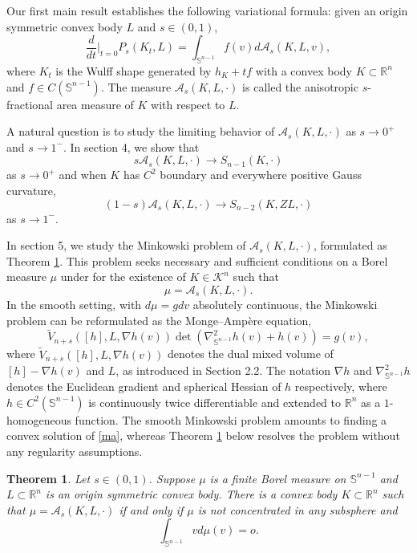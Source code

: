 \documentclass[12pt, oneside,reqno]{amsart}
\numberwithin{equation}{section}
\newtheorem{theorem}{Theorem}[section]
\newtheorem{definition and theorem}[theorem]{Definition and Theorem}
\newcommand{\tA}{\mathcal{A}_s}
\theoremstyle{plain}
\theoremstyle{remark}
\theoremstyle{definition}
\newcommand{\sn}{{\mathbb S}^{n-1}}
\newcommand{\cb}{\color{blue}}
\newcommand{\rn}{\mathbb R^n}
\newcommand{\tk}{\mathcal{K}}
\begin{document}



Our first main result establishes the following variational formula: given an origin symmetric convex body $L$ and $s\in(0,1)$,  
\[\frac{d}{dt}\Big|_{t=0}P_s(K_t,L)=\int_{\sn}f(v)d\tA(K,L,v),\]
where $K_t$ is the Wulff shape generated by $h_K+tf$ with a convex body $K\subset\rn$ and $f\in C(\sn)$. The measure $\tA(K,L,\cdot)$ is called the anisotropic $s$-fractional area measure of $K$ with respect to $L$.


A natural question is to study the limiting behavior of $\tA(K,L,\cdot)$ as $s\rightarrow 0^+$ and $s\rightarrow 1^-$. In section 4, we show that
\[s\tA(K,L,\cdot)\rightarrow S_{n-1}(K,\cdot)\]
as $s\rightarrow 0^+$ and when $K$ has $C^2$ boundary and everywhere positive Gauss curvature,
\[(1-s)\tA(K,L,\cdot)\rightarrow S_{n-2}(K,ZL,\cdot)\]
as $s\rightarrow 1^-$. 


In section 5, we study the Minkowski problem of $\tA(K,L,\cdot)$, formulated as Theorem \ref{main}. This problem seeks necessary and sufficient conditions on a Borel measure $\mu$ under for the existence of $K \in \tk^n$ such that
\[\mu = \tA(K,L,\cdot).\] 
In the smooth setting, with $d\mu = gdv$ absolutely continuous, the Minkowski problem can be reformulated as the Monge–Amp{\`e}re equation,
\begin{equation}\label{ma}
    \tilde{V}_{n+s}([h],L,\nabla h(v))\det (\nabla_{\sn}^2h(v)+h(v))=g(v),
\end{equation}
where $\tilde{V}_{n+s}([h],L,\nabla h(v))$ denotes the dual mixed volume of $[h]-\nabla h(v)$ and $L$, as introduced in Section 2.2. The notation $\nabla h$ and $\nabla_{\sn}^2 h$ denotes the Euclidean  gradient and spherical Hessian of $h$ respectively, where $h\in C^2(\sn)$ is continuously twice differentiable and extended to $\rn$ as a $1$-homogeneous function. The smooth Minkowski problem amounts to finding a convex solution of \eqref{ma}, whereas Theorem \ref{main} below resolves the problem without any regularity assumptions.


\begin{theorem}\label{main}
    Let $s\in(0,1)$. Suppose $\mu$ is a finite Borel measure on $\sn$ and $L\subset\rn$ is an origin symmetric convex body. There is a convex body $K\subset\rn$ such that $\mu=\tA(K,L,\cdot)$ if and only if $\mu$ is not concentrated in any subsphere and
    \[\int_{\sn}vd\mu(v)=o.\]
\end{theorem}
\end{document}
